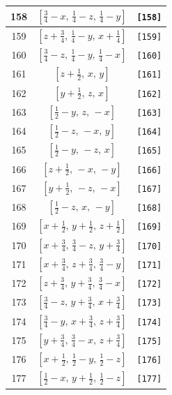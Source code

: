 \documentclass[fleqn,8pt]{jsarticle}
\begin{document}
\begin{longtable}{ccc}
158 & $\left[ \frac{3}{4} - x,\, \frac{1}{4} - z,\, \frac{1}{4} - y \right]$ & {\tt [158]} \\ \hline
159 & $\left[ z + \frac{3}{4},\, \frac{1}{4} - y,\, x + \frac{1}{4} \right]$ & {\tt [159]} \\ \hline
160 & $\left[ \frac{3}{4} - z,\, \frac{1}{4} - y,\, \frac{1}{4} - x \right]$ & {\tt [160]} \\ \hline
161 & $\left[ z + \frac{1}{2},\, x,\, y \right]$ & {\tt [161]} \\ \hline
162 & $\left[ y + \frac{1}{2},\, z,\, x \right]$ & {\tt [162]} \\ \hline
163 & $\left[ \frac{1}{2} - y,\, z,\, - x \right]$ & {\tt [163]} \\ \hline
164 & $\left[ \frac{1}{2} - z,\, - x,\, y \right]$ & {\tt [164]} \\ \hline
165 & $\left[ \frac{1}{2} - y,\, - z,\, x \right]$ & {\tt [165]} \\ \hline
166 & $\left[ z + \frac{1}{2},\, - x,\, - y \right]$ & {\tt [166]} \\ \hline
167 & $\left[ y + \frac{1}{2},\, - z,\, - x \right]$ & {\tt [167]} \\ \hline
168 & $\left[ \frac{1}{2} - z,\, x,\, - y \right]$ & {\tt [168]} \\ \hline
169 & $\left[ x + \frac{1}{2},\, y + \frac{1}{2},\, z + \frac{1}{2} \right]$ & {\tt [169]} \\ \hline
170 & $\left[ x + \frac{3}{4},\, \frac{3}{4} - z,\, y + \frac{3}{4} \right]$ & {\tt [170]} \\ \hline
171 & $\left[ x + \frac{3}{4},\, z + \frac{3}{4},\, \frac{3}{4} - y \right]$ & {\tt [171]} \\ \hline
172 & $\left[ z + \frac{3}{4},\, y + \frac{3}{4},\, \frac{3}{4} - x \right]$ & {\tt [172]} \\ \hline
173 & $\left[ \frac{3}{4} - z,\, y + \frac{3}{4},\, x + \frac{3}{4} \right]$ & {\tt [173]} \\ \hline
174 & $\left[ \frac{3}{4} - y,\, x + \frac{3}{4},\, z + \frac{3}{4} \right]$ & {\tt [174]} \\ \hline
175 & $\left[ y + \frac{3}{4},\, \frac{3}{4} - x,\, z + \frac{3}{4} \right]$ & {\tt [175]} \\ \hline
176 & $\left[ x + \frac{1}{2},\, \frac{1}{2} - y,\, \frac{1}{2} - z \right]$ & {\tt [176]} \\ \hline
177 & $\left[ \frac{1}{2} - x,\, y + \frac{1}{2},\, \frac{1}{2} - z \right]$ & {\tt [177]} \\ \hline

\end{longtable}
\end{document}
